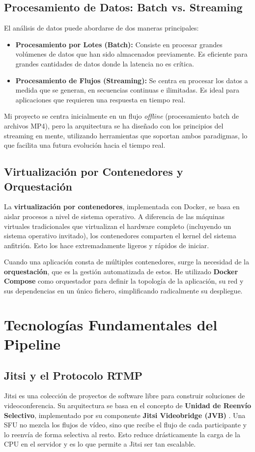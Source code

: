 \subsection{Procesamiento de Datos: Batch vs. Streaming}
El análisis de datos puede abordarse de dos maneras principales:
\begin{itemize}
    \item \textbf{Procesamiento por Lotes (Batch):} Consiste en procesar grandes volúmenes de datos que han sido almacenados previamente. Es eficiente para grandes cantidades de datos donde la latencia no es crítica.
    \item \textbf{Procesamiento de Flujos (Streaming):} Se centra en procesar los datos a medida que se generan, en secuencias continuas e ilimitadas. Es ideal para aplicaciones que requieren una respuesta en tiempo real.
\end{itemize}
Mi proyecto se centra inicialmente en un flujo \textit{offline} (procesamiento batch de archivos MP4), pero la arquitectura se ha diseñado con los principios del streaming en mente, utilizando herramientas que soportan ambos paradigmas, lo que facilita una futura evolución hacia el tiempo real.

\subsection{Virtualización por Contenedores y Orquestación}
La \textbf{virtualización por contenedores}, implementada con Docker, se basa en aislar procesos a nivel de sistema operativo. A diferencia de las máquinas virtuales tradicionales que virtualizan el hardware completo (incluyendo un sistema operativo invitado), los contenedores comparten el kernel del sistema anfitrión. Esto los hace extremadamente ligeros y rápidos de iniciar.

Cuando una aplicación consta de múltiples contenedores, surge la necesidad de la \textbf{orquestación}, que es la gestión automatizada de estos. He utilizado \textbf{Docker Compose} como orquestador para definir la topología de la aplicación, su red y sus dependencias en un único fichero, simplificando radicalmente su despliegue.

\section{Tecnologías Fundamentales del Pipeline}
\label{sec:conceptos_tecnologias}

\subsection{Jitsi y el Protocolo RTMP}
Jitsi es una colección de proyectos de software libre para construir soluciones de videoconferencia. Su arquitectura se basa en el concepto de \textbf{Unidad de Reenvío Selectivo}, implementado por su componente \textbf{Jitsi Videobridge (JVB)} \cite{JitsiJibriDocs}. Una SFU no mezcla los flujos de vídeo, sino que recibe el flujo de cada participante y lo reenvía de forma selectiva al resto. Esto reduce drásticamente la carga de la CPU en el servidor y es lo que permite a Jitsi ser tan escalable.

